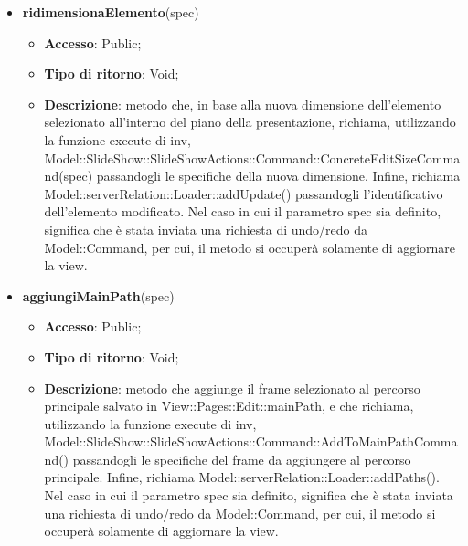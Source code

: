 {{\begin{itemize}
\begin{itemize}
			\item \textbf{Tipo di ritorno}: Void;
			\item \textbf{Descrizione}: metodo che, in base al nuovo posizionamento dell'elemento selezionato all'interno del piano della presentazione, richiama, utilizzando la funzione execute di inv, Model::\-SlideShow::\-SlideShowActions::\-Command::\-ConcreteEditPositionCommand() passandogli le specifiche della nuova posizione. Infine, richiama Model::\-serverRelation::\-Loader::\-addUpdate() passandogli l'identificativo dell'elemento modificato. Nel caso in cui il parametro spec sia definito, significa che è stata inviata una richiesta di undo/redo da Model::\-Command, per cui, il metodo si occuperà solamente di aggiornare la view.
		\end{itemize}
		\item \textbf{ridimensionaElemento}(spec)
		\begin{itemize}
			\item \textbf{Accesso}: Public;
			\item \textbf{Tipo di ritorno}: Void;
			\item \textbf{Descrizione}: metodo che, in base alla nuova dimensione dell'elemento selezionato all'interno del piano della presentazione, richiama, utilizzando la funzione execute di inv, Model::\-SlideShow::\-SlideShowActions::\-Command::\-ConcreteEditSizeCommand(spec) passandogli le specifiche della nuova dimensione. Infine, richiama Model::\-serverRelation::\-Loader::\-addUpdate() passandogli l'identificativo dell'elemento modificato. Nel caso in cui il parametro spec sia definito, significa che è stata inviata una richiesta di undo/redo da Model::\-Command, per cui, il metodo si occuperà solamente di aggiornare la view.
		\end{itemize}
		\item \textbf{aggiungiMainPath}(spec)
		\begin{itemize}
			\item \textbf{Accesso}: Public;
			\item \textbf{Tipo di ritorno}: Void;
			\item \textbf{Descrizione}: metodo che aggiunge il frame selezionato al percorso principale salvato in View::Pages::Edit::mainPath, e che richiama, utilizzando la funzione execute di inv, Model::\-SlideShow::\-SlideShowActions::\-Command::\-AddToMainPathCommand() passandogli le specifiche del frame da aggiungere al percorso principale. Infine, richiama Model::\-serverRelation::\-Loader::\-addPaths(). Nel caso in cui il parametro spec sia definito, significa che è stata inviata una richiesta di undo/redo da Model::\-Command, per cui, il metodo si occuperà solamente di aggiornare la view.

\end{itemize}
\end{itemize}}}
